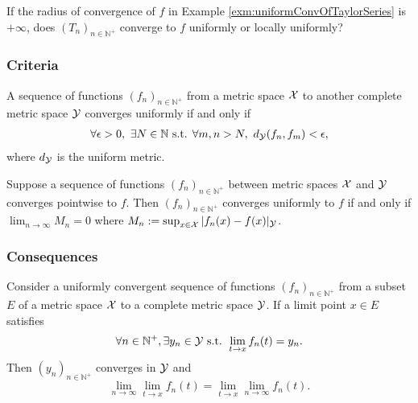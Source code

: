 \begin{exc}
  If the radius of convergence of $f$ in
  Example \ref{exm:uniformConvOfTaylorSeries} 
  is $+\infty$,
  does $(T_n)_{n\in\mathbb{N}^+}$ converge to $f$
  uniformly or locally uniformly?
\end{exc}

\subsubsection{Criteria}

\begin{thm}
  \label{thm:CauchyCriterionUniformConv}
  A sequence of functions $(f_n)_{n\in\mathbb{N}^+}$ 
  from a metric space ${\cal X}$
  to another complete metric space ${\cal Y}$
  converges uniformly if and only if
  \begin{equation}
    \label{eq:CauchyCriterionUniformConv}
    \begin{array}{l}
    \forall \epsilon>0,\ \exists N\in\mathbb{N} \text{ s.t. }
    \forall m,n > N,\
    d_{\cal Y}(f_n, f_m) < \epsilon, 
    \end{array}
  \end{equation}
  where $d_{\cal Y}$ is the uniform metric. 
\end{thm}

\begin{lem}
  \label{lem:pointwise2uniformConvergence}
  Suppose a sequence of functions $(f_n)_{n\in\mathbb{N}^+}$ 
  between metric spaces ${\cal X}$ and ${\cal Y}$
  converges pointwise to $f$. %
  Then $(f_n)_{n\in\mathbb{N}^+}$ converges
  uniformly to $f$ if and only if
  $\lim_{n\rightarrow \infty} M_n =0$
  where $M_n:=\sup_{x\in {\cal X}}|f_n(x)-f(x)|_{\cal Y}$.
\end{lem}

\subsubsection{Consequences}

\begin{lem}
  \label{lem:uniformConvergenceAndCont}
  Consider a uniformly convergent sequence of functions
  $(f_n)_{n\in\mathbb{N}^+}$  %
  from a subset $E$ of a metric space ${\cal X}$
  to a complete metric space ${\cal Y}$. 
  If a limit point $x\in E$ satisfies
  \begin{equation}
    \label{eq:uniformConvergenceAndContCondition}
    \forall n\in\mathbb{N}^+, \exists y_n\in {\cal Y} \text{ s.t. }
    \lim_{t\rightarrow x}f_n(t) = y_n.
  \end{equation}
  Then $(y_n)_{n\in\mathbb{N}^+}$ converges in ${\cal Y}$
  and 
  \begin{equation}
    \label{eq:uniformConvergenceAndCont}
    \lim_{n\rightarrow\infty} \lim_{t\rightarrow x}f_n(t)
    = \lim_{t\rightarrow x}\lim_{n\rightarrow\infty}f_n(t).
  \end{equation}
\end{lem}

